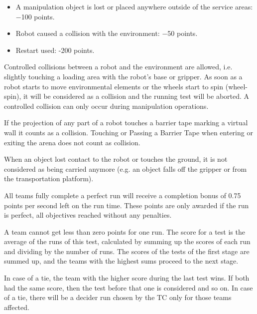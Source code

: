 \begin{itemize}
	\item A manipulation object is lost or placed anywhere outside of the service areas: −100 points.
	\item Robot caused a collision with the environment: −50 points.
	\item Restart used: -200 points.
\end{itemize}

Controlled collisions between a robot and the environment are allowed, i.e. slightly touching a loading area with the robot’s base or gripper. As soon as a robot starts to move environmental elements or the wheels start to spin (wheel-spin), it will be considered as a collision and the running test will be aborted. A controlled collision can only occur during manipulation operations. 
\par
If the projection of any part of a robot touches a barrier tape marking a virtual wall it counts as a collision. Touching or Passing a Barrier Tape when entering or exiting the arena does not count as collision.
\par
When an object lost contact to the robot or touches the ground, it is not considered as being carried anymore (e.g. an object falls off the gripper or from the transportation platform).
\par
All teams fully complete a perfect run will receive a completion bonus of 0.75 points per second left on the run time. These points are only awarded if the run is perfect, all objectives reached without any penalties.
\par
A team cannot get less than zero points for one run. The score for a test is the average of the runs of this test, calculated by summing up the scores of each run and dividing by the number of runs. The scores of the tests of the first stage are summed up, and the teams with the highest sums proceed to the next stage.
\par
In case of a tie, the team with the higher score during the last test wins. If both had the same score, then the test before that one is considered and so on. In case of a tie, there will be a decider run chosen by the TC only for those teams affected.
\par
\par

